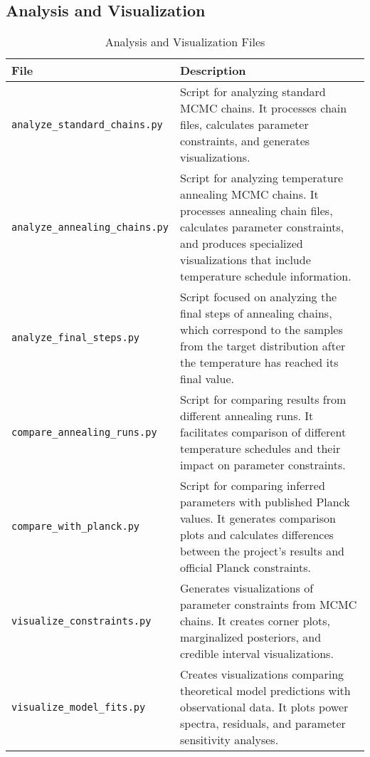 \documentclass[11pt]{article}
\begin{document}
\subsection{Analysis and Visualization}

\begin{table}[H]
\centering
\begin{tabular}{p{4cm}p{11cm}}
\toprule
\textbf{File} & \textbf{Description} \\
\midrule
\texttt{analyze\_standard\_chains.py} & Script for analyzing standard MCMC chains. It processes chain files, calculates parameter constraints, and generates visualizations. \\
\addlinespace
\texttt{analyze\_annealing\_chains.py} & Script for analyzing temperature annealing MCMC chains. It processes annealing chain files, calculates parameter constraints, and produces specialized visualizations that include temperature schedule information. \\
\addlinespace
\texttt{analyze\_final\_steps.py} & Script focused on analyzing the final steps of annealing chains, which correspond to the samples from the target distribution after the temperature has reached its final value. \\
\addlinespace
\texttt{compare\_annealing\_runs.py} & Script for comparing results from different annealing runs. It facilitates comparison of different temperature schedules and their impact on parameter constraints. \\
\addlinespace
\texttt{compare\_with\_planck.py} & Script for comparing inferred parameters with published Planck values. It generates comparison plots and calculates differences between the project's results and official Planck constraints. \\
\addlinespace
\texttt{visualize\_constraints.py} & Generates visualizations of parameter constraints from MCMC chains. It creates corner plots, marginalized posteriors, and credible interval visualizations. \\
\addlinespace
\texttt{visualize\_model\_fits.py} & Creates visualizations comparing theoretical model predictions with observational data. It plots power spectra, residuals, and parameter sensitivity analyses. \\
\bottomrule
\end{tabular}
\caption{Analysis and Visualization Files}
\label{tab:analysis-files}
\end{table}

\newpage
\end{document}
